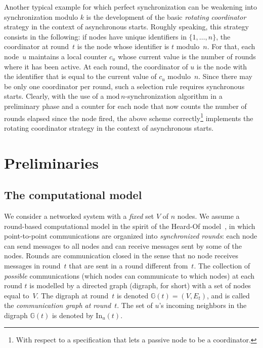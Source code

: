 \documentclass{article}
\newcommand{\dG}{\mathds{G}}
\newcommand{\In}{\mathrm{In}}
\begin{document}
Another typical example for which perfect synchronization can be weakening into synchronization modulo $k$ is
	the development of the basic \emph{rotating coordinator} strategy in the context of asynchronous starts.
Roughly speaking, this strategy consists in the following: if nodes have unique identifiers in $\{1,\dots,n\}$,
	the coordinator at round~$t$ is the node whose identifier is  $t$ modulo~$n$.
For that, 	 each node~$u$ maintains a local counter $c_u$
	whose current value is the number of rounds where it has been active.
At each round, the  coordinator of $u$ is the  node with the identifier that is equal to the current value of $c_u$ modulo~$n$.
Since there may be only one coordinator per round, such a selection rule requires synchronous starts.
Clearly, with the use of a ${\mathrm{mod}\,n}$-synchronization algorithm in a preliminary phase and a
	counter for each node that now counts the number of rounds elapsed since the node fired, the above scheme correctly\footnote{%
	With respect to a specification that lets a passive node to be  a coordinator.}
	implements the rotating coordinator strategy in the context of asynchronous starts.

\section{ Preliminaries}\label{sec:model}
 
\subsection{The computational model}
	
We consider a networked system with a {\em fixed} set $V$ of $n$ nodes.
We assume a round-based computational model  in the spirit of the Heard-Of model~\cite{CBS09}, 
	in which point-to-point communications are organized into \emph{synchronized rounds}: 
	each node can send messages  to all nodes and can receive messages sent  by some of the nodes.
Rounds are communication closed in the sense that no node receives messages in round~$t$ that are sent 
	in a round different from~$t$. 
The collection of \emph{possible} communications (which nodes can communicate to which nodes) at each round $t$
	is modelled by a directed graph (digraph, for short) with a set of nodes equal to~$V$.
The digraph at round~$t$ is  denoted $\dG(t)=(V,E_t)$, and is called the \emph{communication graph at round}~$t$. 
The set of $u$'s incoming neighbors in the digraph $\dG(t)$ is denoted by $\In_u(t)$.
\end{document}
